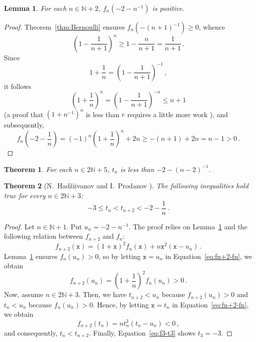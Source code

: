\documentclass[12pt]{article}
\newcommand{\bN}{\mathbb{N}}
\newcommand{\ttx}{\mathtt{x}}
\newtheorem{theorem}{Theorem}
\newtheorem{lemma}{Lemma}
\begin{document}
 \begin{lemma} \label{lem:fun-positive}
   For each $n \in \bN + 2$, $f_n(- 2 - n^{-1})$ is positive.
 \end{lemma}
 
 \begin{proof}
   Theorem~\ref{thm:Bernoulli} ensures $f_n(- {(n + 1)}^{-1}) \ge 0$, whence
   $$
   \left( 1 - \frac{1}{n + 1} \right)^n \ge 1 - \frac{n}{n + 1} = \frac{1}{n + 1} \, .
   $$
   Since 
   $$
   1 + \frac{1}{n} = \left( 1 - \frac{1}{n + 1} \right)^{-1} \,,
   $$
   it follows 
   $$
  \left( 1 + \frac{1}{n} \right)^n = \left( 1 - \frac{1}{n + 1} \right)^{-n}  \le n + 1 
  $$
  (a proof that ${(1 + n^{-1} )}^n$ is less than $e$ requires a little more work \cite{Wiener85}),
  and subsequently,
  $$
  f_n \left(- 2 - \frac{1}{n} \right) = {(- 1)}^n \left( 1 + \frac{1}{n} \right)^n + 2 n \ge - (n + 1) + 2 n = n - 1 > 0 \,.
  $$
  
\end{proof}

\begin{theorem}
  For each $n \in 2 \bN + 5$, $t_n$ is less than $- 2 - {(n - 2)}^{-1}$.
\end{theorem}


 
 \begin{theorem}[N.~Had\v{z}iivanov and I.~Prodanov \cite{MitrinovicAI,MitrinovicCNIA,MondP94,MitrinovicP93}] \label{thm:bulgare}
   The following inequalities hold true for every $n \in 2 \bN + 3$:
   $$
   - 3 \le t_n < t_{n + 2} < - 2 - \frac{1}{n} \,.
   $$
 \end{theorem}
 
 \begin{proof}
   Let $n \in \bN + 1$.
   Put $u_n = - 2 - n^{-1}$.
   The proof relies on Lemma~\ref{lem:fun-positive} and the following relation between $f_{n + 2}$ and $f_n$:
   \begin{equation} \label{eq:fn+2-fn}
   f_{n + 2} (\ttx) = {(1 + \ttx)}^2 f_n(\ttx) + n \ttx^2 (\ttx - u_n) \,.
 \end{equation}
 Lemma~\ref{lem:fun-positive} ensures $f_n(u_n) > 0$,
 so by letting  $\ttx = u_n$ in Equation~\eqref{eq:fn+2-fn},
 we obtain
 $$
   f_{n + 2} (u_n)  = {\left(1 + \frac{1}{n} \right)}^2 f_n(u_n) > 0 \, .
  $$
  Now, assume $n \in 2 \bN + 3$.
  Then, we have
  $t_{n + 2} < u_n$ because $f_{n + 2}(u_n) > 0$
  and
  $t_n < u_n$ because $f_n(u_n) > 0$.
   Hence, by letting $\ttx = t_n$ in Equation~\eqref{eq:fn+2-fn},
   we obtain
   $$
   f_{n + 2} (t_n)  = n t_n^2 (t_n - u_n) < 0 \,, 
   $$
   and consequently, $t_n < t_{n + 2}$.
   Finally, Equation~\eqref{eq:f3-t3} shows $t_3 = - 3$.
 \end{proof}   

 
  
\end{document}

